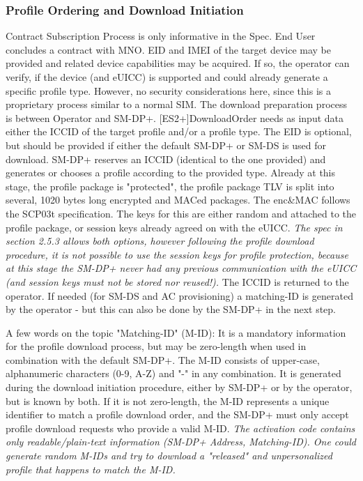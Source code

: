 \subsubsection{Profile Ordering and Download Initiation}
Contract Subscription Process is only informative in the Spec. End User concludes a contract with MNO. EID and IMEI of the target device may be provided and related device capabilities may be acquired. If so, the operator can verify, if the device (and eUICC) is supported and could already generate a specific profile type. However, no security considerations here, since this is a proprietary process similar to a normal SIM.
The download preparation process is between Operator and SM-DP+. [ES2+]DownloadOrder needs as input data either the ICCID of the target profile and/or a profile type. The EID is optional, but should be provided if either the default SM-DP+ or SM-DS is used for download. SM-DP+ reserves an ICCID (identical to the one provided) and generates or chooses a profile according to the provided type. Already at this stage, the profile package is "protected", the profile package TLV is split into several, 1020 bytes long encrypted and MACed packages. The enc\&MAC follows the SCP03t specification. The keys for this are either random and attached to the profile package, or session keys already agreed on with the eUICC. \textit{The spec in section 2.5.3 allows both options, however following the profile download procedure, it is not possible to use the session keys for profile protection, because at this stage the SM-DP+ never had any previous communication with the eUICC (and session keys must not be stored nor reused!).} The ICCID is returned to the operator. If needed (for SM-DS and AC provisioning) a matching-ID is generated by the operator - but this can also be done by the SM-DP+ in the next step. 

A few words on the topic "Matching-ID" (M-ID): It is a mandatory information for the profile download process, but may be zero-length when used in combination with the default SM-DP+. The M-ID consists of upper-case, alphanumeric characters (0-9, A-Z) and "-" in any combination. It is generated during the download initiation procedure, either by SM-DP+ or by the operator, but is known by both. If it is not zero-length, the M-ID represents a unique identifier to match a profile download order, and the SM-DP+ must only accept profile download requests who provide a valid M-ID. \textit{The activation code contains only readable/plain-text information (SM-DP+ Address, Matching-ID). One could generate random M-IDs and try to download a "released" and unpersonalized profile that happens to match the M-ID.} 

